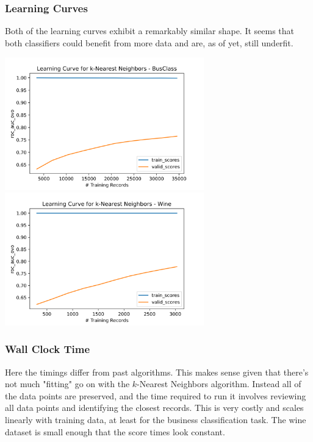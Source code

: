 \documentclass[
	letterpaper, %
]{jdf}
\begin{document}
\subsubsection{Learning Curves}
Both of the learning curves exhibit a remarkably similar shape. It seems that both classifiers could benefit from more data and are, as of yet, still underfit.

\includegraphics[width=3.4in]{Figures/BusClass-0920/KNN/learn_curve.png}
\includegraphics[width=3.4in]{Figures/Wine-0921/KNN/learn_curve.png}

\subsubsection{Wall Clock Time}
Here the timings differ from past algorithms. This makes sense given that there's not much "fitting" go on with the $k$-Nearest Neighbors algorithm. Instead all of the data points are preserved, and the time required to run it involves reviewing all data points and identifying the closest records. This is very costly and scales linearly with training data, at least for the business classification task. The wine dataset is small enough that the score times look constant.
\end{document}
